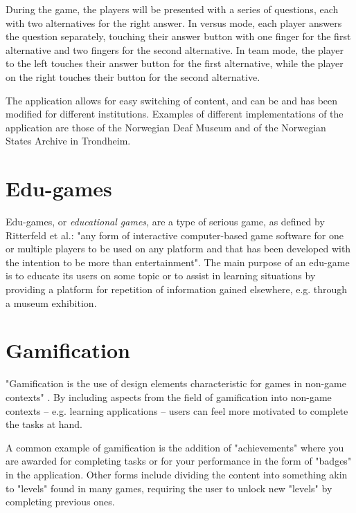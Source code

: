 During the game, the players will be presented with a series of questions, each with two alternatives for the right answer. In versus mode, each player answers the question separately, touching their answer button with one finger for the first alternative and two fingers for the second alternative. In team mode, the player to the left touches their answer button for the first alternative, while the player on the right touches their button for the second alternative.

The application allows for easy switching of content, and can be and has been modified for different institutions. Examples of different implementations of the application are those of the Norwegian Deaf Museum and of the Norwegian States Archive in Trondheim.


\section{Edu-games}

Edu-games, or \emph{educational games}, are a type of serious game, as defined by Ritterfeld et al.: "any form of interactive computer-based game software for one or multiple players to be used on any platform and that has been developed with the intention to be more than entertainment"\cite{Ritterfeld}. The main purpose of an edu-game is to educate its users on some topic or to assist in learning situations by providing a platform for repetition of information gained elsewhere, e.g. through a museum exhibition.


\section{Gamification}

"Gamification is the use of design elements characteristic for games in non-game contexts" \citep{Deterding}. By including aspects from the field of gamification into non-game contexts – e.g. learning applications – users can feel more motivated to complete the tasks at hand.

A common example of gamification is the addition of "achievements" where you are awarded for completing tasks or for your performance in the form of "badges" in the application. Other forms include dividing the content into something akin to "levels" found in many games, requiring the user to unlock new "levels" by completing previous ones.
